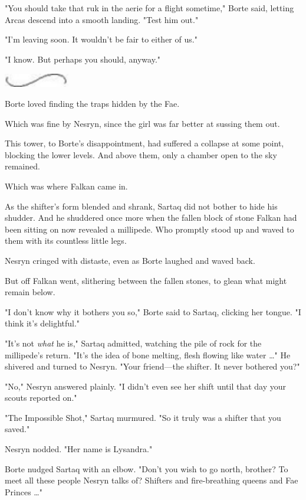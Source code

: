 "You should take that ruk in the aerie for a flight sometime," Borte said, letting Arcas descend into a smooth landing.
"Test him out."

"I'm leaving soon.
It wouldn't be fair to either of us."

"I know.
But perhaps you should, anyway."

\begin{center}
	\includegraphics[width=1.12in,height=0.24in]{images/seperator}
\end{center}

Borte loved finding the traps hidden by the Fae.

Which was fine by Nesryn, since the girl was far better at sussing them out.

This tower, to Borte's disappointment, had suffered a collapse at some point, blocking the lower levels.
And above them, only a chamber open to the sky remained.

Which was where Falkan came in.

As the shifter's form blended and shrank, Sartaq did not bother to hide his shudder.
And he shuddered once more when the fallen block of stone Falkan had been sitting on now revealed a millipede.
Who promptly stood up and waved to them with its countless little legs.

Nesryn cringed with distaste, even as Borte laughed and waved back.

But off Falkan went, slithering between the fallen stones, to glean what might remain below.

"I don't know why it bothers you so," Borte said to Sartaq, clicking her tongue.
"I think it's delightful."

"It's not \emph{what} he is," Sartaq admitted, watching the pile of rock for the millipede's return.
"It's the idea of bone melting, flesh flowing like water \ldots" He shivered and turned to Nesryn.
"Your friend---the shifter.
It never bothered you?"

"No," Nesryn answered plainly.
"I didn't even see her shift until that day your scouts reported on."

"The Impossible Shot," Sartaq murmured.
"So it truly was a shifter that you saved."

Nesryn nodded.
"Her name is Lysandra."

Borte nudged Sartaq with an elbow.
"Don't you wish to go north, brother?
To meet all these people Nesryn talks of?
Shifters and fire-breathing queens and Fae Princes \ldots"

